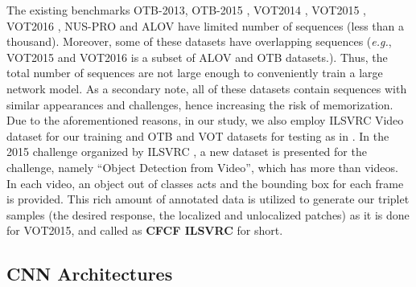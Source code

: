 \documentclass[journal]{IEEEtran}
\begin{document}
The existing benchmarks OTB-2013\cite{Benchmark2013}, OTB-2015 \cite{BenchmarkPAMI}, VOT2014 \cite{VOT2014}, VOT2015 \cite{VOT2015}, VOT2016 \cite{VOT2016}, NUS-PRO \cite{NUS-PRO} and ALOV \cite{ALOV} have limited number of sequences (less than a thousand). Moreover, some of these datasets have overlapping sequences (\emph{e.g.}, VOT2015 and VOT2016 is a subset of ALOV and OTB datasets.). Thus, the total number of  sequences are not large enough to conveniently train a large network model. As a secondary note, all of these datasets contain sequences with similar appearances and challenges, hence increasing the risk of memorization. Due to the aforementioned reasons, in our study, we also employ ILSVRC Video dataset for our training and OTB and VOT datasets for testing as in \cite{SiamFC}. In the 2015 challenge organized by ILSVRC \cite{ILSVRC2015}, a new dataset is presented for the challenge, namely ``Object Detection from Video'', which has more than  videos. In each video, an object out of  classes acts and the bounding box for each frame is provided. This rich amount of annotated data is utilized to generate our  triplet samples (the desired response, the localized and unlocalized patches) as it is done for VOT2015, and called as \textbf{CFCF ILSVRC} for short.

  
\subsection{CNN Architectures}
\end{document}
